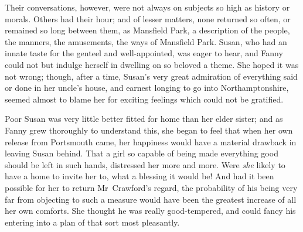 Their conversations, however, were not always on subjects so high as history or morals. Others had their hour; and of lesser matters, none returned so often, or remained so long between them, as Mansfield Park, a description of the people, the manners, the amusements, the ways of Mansfield Park. Susan, who had an innate taste for the genteel and well-appointed, was eager to hear, and Fanny could not but indulge herself in dwelling on so beloved a theme. She hoped it was not wrong; though, after a time, Susan's very great admiration of everything said or done in her uncle's house, and earnest longing to go into Northamptonshire, seemed almost to blame her for exciting feelings which could not be gratified.

Poor Susan was very little better fitted for home than her elder sister; and as Fanny grew thoroughly to understand this, she began to feel that when her own release from Portsmouth came, her happiness would have a material drawback in leaving Susan behind. That a girl so capable of being made everything good should be left in such hands, distressed her more and more. Were \textit{she}  likely to have a home to invite her to, what a blessing it would be! And had it been possible for her to return Mr~Crawford's regard, the probability of his being very far from objecting to such a measure would have been the greatest increase of all her own comforts. She thought he was really good-tempered, and could fancy his entering into a plan of that sort most pleasantly. 